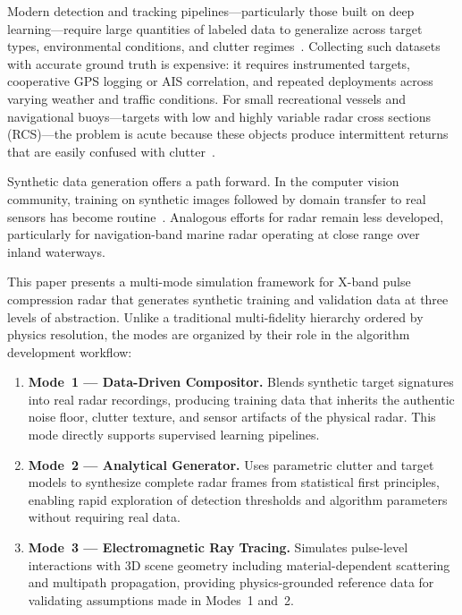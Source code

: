 \documentclass[conf]{new-aiaa}
\begin{document}
Modern detection and tracking pipelines---particularly those built on deep learning---require large quantities of labeled data to generalize across target types, environmental conditions, and clutter regimes~\cite{nikolenko2021synthetic}. Collecting such datasets with accurate ground truth is expensive: it requires instrumented targets, cooperative GPS logging or AIS correlation, and repeated deployments across varying weather and traffic conditions. For small recreational vessels and navigational buoys---targets with low and highly variable radar cross sections (RCS)---the problem is acute because these objects produce intermittent returns that are easily confused with clutter~\cite{ward2013sea, swerling1960probability}.

Synthetic data generation offers a path forward. In the computer vision community, training on synthetic images followed by domain transfer to real sensors has become routine~\cite{tobin2017domain, tremblay2018training}. Analogous efforts for radar remain less developed, particularly for navigation-band marine radar operating at close range over inland waterways.

This paper presents a multi-mode simulation framework for X-band pulse compression radar that generates synthetic training and validation data at three levels of abstraction. Unlike a traditional multi-fidelity hierarchy ordered by physics resolution, the modes are organized by their role in the algorithm development workflow:

\begin{enumerate}
    \item \textbf{Mode~1 --- Data-Driven Compositor.} Blends synthetic target signatures into real radar recordings, producing training data that inherits the authentic noise floor, clutter texture, and sensor artifacts of the physical radar. This mode directly supports supervised learning pipelines.
    \item \textbf{Mode~2 --- Analytical Generator.} Uses parametric clutter and target models to synthesize complete radar frames from statistical first principles, enabling rapid exploration of detection thresholds and algorithm parameters without requiring real data.
    \item \textbf{Mode~3 --- Electromagnetic Ray Tracing.} Simulates pulse-level interactions with 3D scene geometry including material-dependent scattering and multipath propagation, providing physics-grounded reference data for validating assumptions made in Modes~1 and~2.
\end{enumerate}
\end{document}
